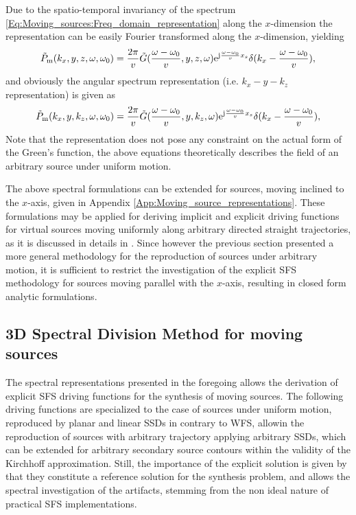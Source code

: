 \vspace{3mm}
Due to the spatio-temporal invariancy of the spectrum \eqref{Eq:Moving_sources:Freq_domain_representation} along the $x$-dimension the representation can be easily Fourier transformed along the $x$-dimension, yielding
\begin{equation}
\tilde{P}_{\mathrm{m}}(k_x,y,z,\omega,\omega_0) =
\frac{2\pi}{v}
\tilde{G}(\frac{\omega-\omega_0}{v}, y, z, \omega)
\mathrm{e}^{\mathrm{j} \frac{\omega-\omega_0}{v} x_s}
 \delta(k_x - \frac{\omega-\omega_0}{v}),
\label{Eq:Moving_sources:MS_field_kx_z}
\end{equation}
and obviously the angular spectrum representation (i.e. $k_x-y-k_z$ representation) is given as
\begin{equation}
\tilde{P}_{\mathrm{m}}(k_x,y,k_z,\omega,\omega_0) =
\frac{2\pi}{v}
\tilde{G}(\frac{\omega-\omega_0}{v}, y, k_z, \omega)
\mathrm{e}^{\mathrm{j} \frac{\omega-\omega_0}{v} x_s}
 \delta(k_x - \frac{\omega-\omega_0}{v}),
\label{Eq:Moving_sources:MS_field_kx_kz}
\end{equation}
Note that the representation does not pose any constraint on the actual form of the Green's function, the above equations theoretically describes the field of an arbitrary source under uniform motion.	

The above spectral formulations can be extended for sources, moving inclined to the $x$-axis, given in Appendix \ref{App:Moving_source_representations}.
These formulations may be applied for deriving implicit and explicit driving functions for virtual sources moving uniformly along arbitrary directed straight trajectories, as it is discussed in details in \cite{firtha2015sound}.
Since however the previous section presented a more general methodology for the reproduction of sources under arbitrary motion, it is sufficient to restrict the investigation of the explicit SFS methodology for sources moving parallel with the $x$-axis, resulting in closed form analytic formulations.

\subsection{3D Spectral Division Method for moving sources}
The spectral representations presented in the foregoing allows the derivation of explicit SFS driving functions for the synthesis of moving sources.
The following driving functions are specialized to the case of sources under uniform motion, reproduced by planar and linear SSDs in contrary to WFS, allowin the reproduction of sources with arbitrary trajectory applying arbitrary SSDs, which can be extended for arbitrary secondary source contours within the validity of the Kirchhoff approximation.
Still, the importance of the explicit solution is given by that they constitute a reference solution for the synthesis problem, and allows the spectral investigation of the artifacts, stemming from the non ideal nature of practical SFS implementations.


